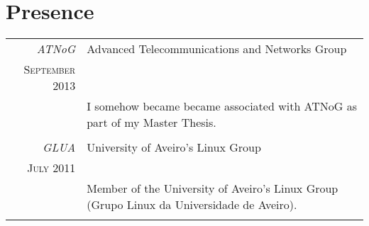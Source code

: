 \documentclass[a4paper,10pt]{article} %
\begin{document}

\section{Presence}
\begin{tabular}{r|p{11cm}}
	\emph{ATNoG} & Advanced Telecommunications and Networks Group \\
	\textsc{September 2013} & \\ 
	& \footnotesize{I somehow became became associated with ATNoG as part of my Master Thesis.}\\
	\multicolumn{2}{c}{} \\
	\emph{GLUA} & University of Aveiro's Linux Group \\
	\textsc{July 2011} & \\ 
	& \footnotesize{Member of the University of Aveiro's Linux Group (Grupo Linux da Universidade de Aveiro).}\\
	\multicolumn{2}{c}{} \\
\end{tabular}


\end{document}
